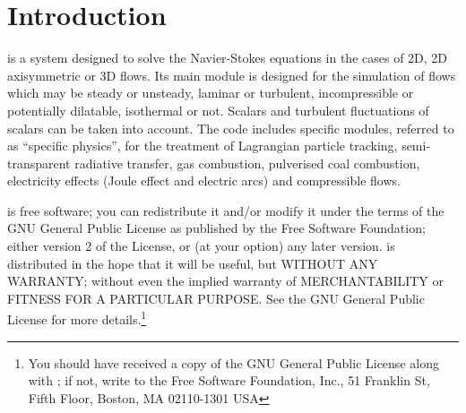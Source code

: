 
%
%
%
%


\nopagebreak
\section{Introduction}

\CS is a system designed to solve the Navier-Stokes
equations in the cases of 2D, 2D axisymmetric or 3D flows. Its main module is
designed for the simulation of flows which may be steady or
unsteady, laminar or turbulent, incompressible or potentially dilatable,
isothermal or not. Scalars and turbulent fluctuations of scalars can be taken into
account. The code includes specific modules, referred to as ``specific physics'',
for the treatment of Lagrangian particle tracking, semi-transparent radiative transfer,
gas combustion, pulverised coal combustion,
electricity effects (Joule effect and electric arcs) and compressible flows.

\CS is free software; you can redistribute it
and/or modify it under the terms of the GNU General Public License
as published by the Free Software Foundation; either version 2 of
the License, or (at your option) any later version.
\CS is distributed in the hope that it will be
useful, but WITHOUT ANY WARRANTY; without even the implied warranty
of MERCHANTABILITY or FITNESS FOR A PARTICULAR PURPOSE.  See the
GNU General Public License for more details.\footnote{You should have
received a copy of the GNU General Public License
along with \CS; if not, write to the
Free Software Foundation, Inc.,
51 Franklin St, Fifth Floor,
Boston, MA  02110-1301  USA}


